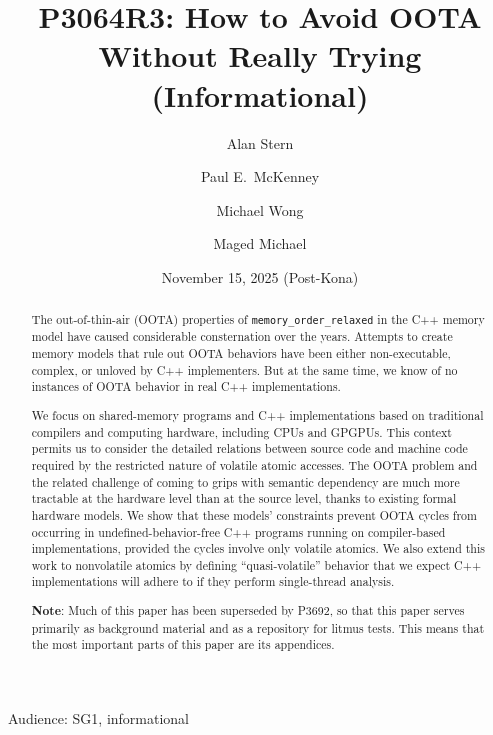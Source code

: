 \documentclass[10]{article}
\begin{document}
\title{P3064R3: How to Avoid OOTA Without Really Trying (Informational)}

\newcommand{\co}[1]{\lstinline[breaklines=yes,breakatwhitespace=yes]{#1}}

\author{
Alan Stern\\{\small {}} \and
Paul E.~McKenney\\{\small {}} \and
Michael Wong\\{\small {}} \and
Maged Michael\\{\small {}}
}
\date{November 15, 2025 (Post-Kona)}
\maketitle{}

Audience: SG1, informational

\begin{abstract}
	The out-of-thin-air (OOTA) properties
	of \co{memory_order_relaxed} in the C++ memory model
	have caused considerable consternation over the years.
	Attempts to create memory models that rule out OOTA behaviors
	have been either non-executable, complex, or unloved by C++
	implementers.
	But at the same time, we know of no instances of OOTA behavior
	in real C++ implementations.

	We focus on shared-memory programs and
	C++ implementations based on traditional compilers and
	computing hardware, including CPUs and GPGPUs.
	This context permits us to consider the detailed relations
	between source code and machine code required by the restricted
	nature of volatile atomic accesses.
	The OOTA problem and the related challenge of coming to grips
	with semantic dependency are much more tractable at the hardware
	level than at the source level, thanks to existing formal
	hardware models.
	We show that these models' constraints prevent OOTA cycles
	from occurring in undefined-behavior-free C++ programs running
	on compiler-based implementations, provided the cycles involve
	only volatile atomics.
	We also extend this work to nonvolatile atomics by defining
	``quasi-volatile'' behavior that we expect C++ implementations
	will adhere to if they perform single-thread analysis.

	{ \bf Note}: Much of this paper has been superseded by P3692,
	so that this paper serves primarily as background material and
	as a repository for litmus tests.
	This means that the most important parts of this paper are
	its appendices.
\end{abstract}
\end{document}
